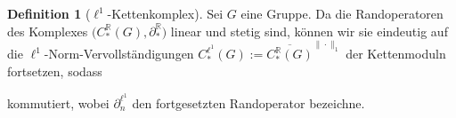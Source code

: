 \documentclass[a4paper,twoside,10pt]{scrreprt}
\newcommand{\R}{\mathbb{R}}
\theoremstyle{definition}
\newtheorem{definition}[satz]{Definition}
\begin{document}
\begin{definition}[$\ell^1$-Kettenkomplex]\label{def:Ell1ChainComplex}
Sei $G$ eine Gruppe. Da die Randoperatoren des Komplexes $\bigl(C_*^{\R}(G),\partial_*^{\R}\bigr)$ linear und stetig sind, können wir sie eindeutig auf die $\ell^1$-Norm-Vervollständigungen $C_*^{\ell^1}(G):=\overline{C_*^{\R}(G)}^{\|\cdot\|_1}$  der Kettenmoduln fortsetzen, sodass 
\begin{center}
\end{center}
kommutiert, wobei $\partial_n^{\ell^1}$ den fortgesetzten Randoperator bezeichne.
\end{definition}
\end{document}
